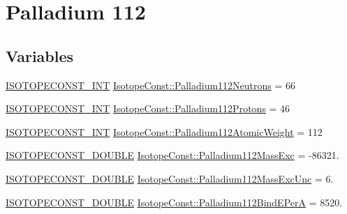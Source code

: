 \hypertarget{group___isotope_const-_palladium-_pd112}{}\section{Palladium 112}
\label{group___isotope_const-_palladium-_pd112}
\subsection*{Variables}
\begin{DoxyCompactItemize}
\item 
\mbox{\hyperlink{group___isotope_const-_macros_ga5f18360b3e99483a35c32d789e62621c}{I\+S\+O\+T\+O\+P\+E\+C\+O\+N\+S\+T\+\_\+\+I\+NT}} \mbox{\hyperlink{group___isotope_const-_palladium-_pd112_gad220aa37b7a2f3f880bc4a63000b0dcc}{Isotope\+Const\+::\+Palladium112\+Neutrons}} = 66
\item 
\mbox{\hyperlink{group___isotope_const-_macros_ga5f18360b3e99483a35c32d789e62621c}{I\+S\+O\+T\+O\+P\+E\+C\+O\+N\+S\+T\+\_\+\+I\+NT}} \mbox{\hyperlink{group___isotope_const-_palladium-_pd112_gae6d8712adb1cda1c1801a3f373fa8349}{Isotope\+Const\+::\+Palladium112\+Protons}} = 46
\item 
\mbox{\hyperlink{group___isotope_const-_macros_ga5f18360b3e99483a35c32d789e62621c}{I\+S\+O\+T\+O\+P\+E\+C\+O\+N\+S\+T\+\_\+\+I\+NT}} \mbox{\hyperlink{group___isotope_const-_palladium-_pd112_ga4bdb9f818ed5c5ba99ef9cc08ee57fd5}{Isotope\+Const\+::\+Palladium112\+Atomic\+Weight}} = 112
\item 
\mbox{\hyperlink{group___isotope_const-_macros_ga8f45a7272ce02c0b4c65c44636ed719a}{I\+S\+O\+T\+O\+P\+E\+C\+O\+N\+S\+T\+\_\+\+D\+O\+U\+B\+LE}} \mbox{\hyperlink{group___isotope_const-_palladium-_pd112_ga6f5bd6ce6b84f3744e196393f8275a10}{Isotope\+Const\+::\+Palladium112\+Mass\+Exc}} = -\/86321.
\item 
\mbox{\hyperlink{group___isotope_const-_macros_ga8f45a7272ce02c0b4c65c44636ed719a}{I\+S\+O\+T\+O\+P\+E\+C\+O\+N\+S\+T\+\_\+\+D\+O\+U\+B\+LE}} \mbox{\hyperlink{group___isotope_const-_palladium-_pd112_ga25752964947197ca1964166c0bcf6f24}{Isotope\+Const\+::\+Palladium112\+Mass\+Exc\+Unc}} = 6.
\item 
\mbox{\hyperlink{group___isotope_const-_macros_ga8f45a7272ce02c0b4c65c44636ed719a}{I\+S\+O\+T\+O\+P\+E\+C\+O\+N\+S\+T\+\_\+\+D\+O\+U\+B\+LE}} \mbox{\hyperlink{group___isotope_const-_palladium-_pd112_gaa102b3e0b0aad53b096f94f7e061a1bd}{Isotope\+Const\+::\+Palladium112\+Bind\+E\+PerA}} = 8520.
\item 

\end{DoxyCompactItemize}
